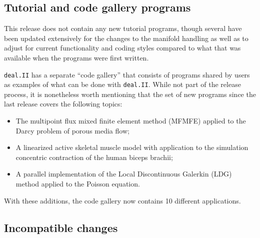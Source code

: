 \documentclass{ansarticle-preprint}
\newcommand{\specialword}[1]{\texttt{#1}}
\newcommand{\dealii}{{\specialword{deal.II}}\xspace}
\begin{document}
\subsection{Tutorial and code gallery programs}

This release does not contain any new tutorial programs, though
several have been updated extensively for the changes to the manifold
handling as well as to adjust for current functionality and coding styles
compared to what that was available when the programs were first written.

\dealii has a separate ``code gallery'' that
consists of programs shared by users as examples of what can be
done with \dealii. While not part of the release process, it is nonetheless
worth mentioning that the set of new programs since the last release covers
the following topics:
\begin{itemize}
\item The multipoint flux mixed finite element method (MFMFE) applied
  to the Darcy problem of porous media flow;
\item A linearized active skeletal muscle model with application to
  the simulation concentric contraction of the human biceps brachii;
\item A parallel implementation of the Local Discontinuous Galerkin
  (LDG) method applied to the Poisson equation.
\end{itemize}
With these additions, the code gallery now contains 10 different applications.


\subsection{Incompatible changes}
\end{document}
